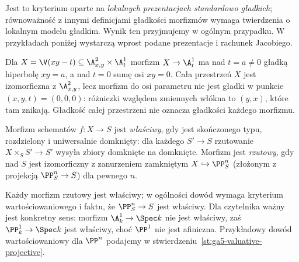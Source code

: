 Jest to kryterium oparte na \emph{lokalnych prezentacjach
standardowo gładkich}; równoważność z innymi definicjami gładkości
morfizmów wymaga twierdzenia o lokalnym modelu gładkim.
Wynik ten przyjmujemy w ogólnym przypadku. W przykładach poniżej
wystarczą wprost podane prezentacje i rachunek Jacobiego.

\begin{przyklad}
Dla $X=\V(xy-t)\subseteq\A^2_{x,y}\times\A^1_t$
morfizm $X\to\A^1_t$ ma nad $t=a\ne0$ gładką hiperbolę
$xy=a$, a nad $t=0$ sumę osi $xy=0$. Cała przestrzeń $X$
jest izomorficzna z $\A^2_{x,y}$, lecz morfizm do osi parametru
nie jest gładki w punkcie $(x,y,t)=(0,0,0)$: różniczki
względem zmiennych włókna to $(y,x)$, które tam znikają.
Gładkość całej przestrzeni nie oznacza gładkości każdego morfizmu.
\end{przyklad}

\begin{definicja}
\label{def:ga5-proper}
Morfizm schematów $f:X\to S$ jest \emph{właściwy}, gdy jest
skończonego typu, rozdzielony i uniwersalnie domknięty:
dla każdego $S'\to S$ rzutowanie
$X\times_S S'\to S'$ wysyła zbiory domknięte na domknięte.
Morfizm jest \emph{rzutowy}, gdy nad $S$ jest izomorficzny
z zanurzeniem zamkniętym $X\hookrightarrow\PP^n_S$
(złożonym z projekcją $\PP^n_S\to S$) dla pewnego $n$.
\end{definicja}

\begin{uwaga}
Każdy morfizm rzutowy jest właściwy; w ogólności dowód wymaga
kryterium wartościowaniowego i faktu, że $\PP^n_S\to S$ jest
właściwy. Dla czytelnika ważny jest konkretny sens:
morfizm $\A^1_k\to\Spec k$ nie jest właściwy, zaś
$\PP^1_k\to\Spec k$ jest właściwy, choć $\PP^1$ nie jest
afiniczna. Przykładowy dowód wartościowaniowy dla
$\PP^n$ podajemy w stwierdzeniu~\ref{st:ga5-valuative-projective}.
\end{uwaga}

